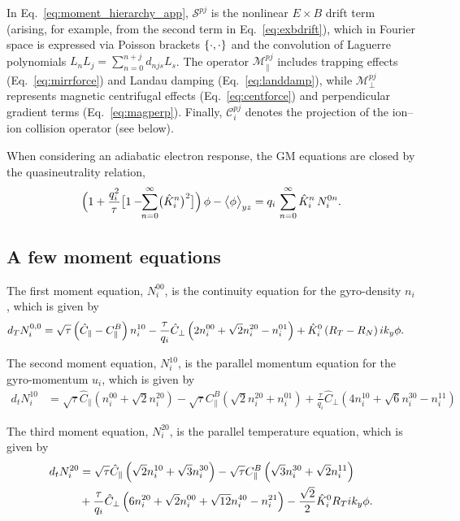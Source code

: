 \documentclass{article}
\begin{document}
In Eq.~\ref{eq:moment_hierarchy_app}, $\mathcal S^{pj}$ is the nonlinear  $E\times B$
drift term (arising, for example, from the second term in Eq.~\ref{eq:exbdrift}),
which in Fourier space is expressed via Poisson brackets $\left\{\cdot,\cdot\right\}$ 
and the convolution of Laguerre polynomials $L_nL_j=\sum_{n=0}^{n+j}d_{njs}L_s$. 
The operator $\mathcal M_{\parallel}^{pj}$ includes trapping effects 
(Eq.~\ref{eq:mirrforce}) and Landau damping (Eq.~\ref{eq:landdamp}), 
while $\mathcal M_{\perp}^{pj}$ represents magnetic centrifugal effects (Eq.~\ref{eq:centforce}) 
and perpendicular gradient terms (Eq.~\ref{eq:magperp}). 
Finally, $\mathcal C_i^{pj}$ denotes the projection of the ion--ion collision operator (see below).  
\par
When considering an adiabatic electron response, the GM equations are closed by the quasineutrality relation,
\begin{equation}
     \Bigl(1 + \frac{q_i^2}{\tau}\bigl[1-\!\!\sum_{n=0}^{\infty}\bigl(\hat K_{i}^n\bigr)^2\bigr]\Bigr)\,\phi  - \bigl\langle \phi \bigr\rangle_{y z} 
      =  q_i\,\sum_{n=0}^{\infty}\hat K_{i}^n\, N_i^{0n}.
    \label{ch5_eq:poisson_moments_adiabe}
\end{equation}

\subsection{A few moment equations}
The first moment equation, $N_i^{00}$, is the continuity equation for the gyro-density $n_i$, which is given by
\begin{align}
\label{eq:moment_0}
d_T N_i^{0,0}  &= \sqrt{\tau} \left( \hat{C}_{\parallel} - C^B_{\parallel} \right) n_i^{10}
- \frac{\tau}{q_i} \hat{C}_{\perp} \left(2 n_i^{00} + \sqrt{2} n_i^{20} - n_i^{01} \right)
+  \hat K_i^0 \left(  R_T - R_N \right) i k_y  \phi.
\end{align}

The second moment equation, $N_i^{10}$, is the parallel momentum equation for the gyro-momentum $u_i$, which is given by
\begin{align}
\label{eq:moment_1}
d_t N_i^{10} &= \sqrt{\tau} \hat{C}_{\parallel} \left( n_i^{00} + \sqrt{2} n_i^{20} \right) 
    - \sqrt{\tau} C^B_{\parallel} \left( \sqrt{2} n_i^{20} + n_i^{01} \right)
    + \frac{\tau}{q_i} \hat{C}_{\perp} \left( 4 n_i^{10} + \sqrt{6} n_i^{30} - n_i^{11} \right)
\end{align}

The third moment equation, $N_i^{20}$, is the parallel temperature equation, which is given by
\begin{align}
\label{eq:moment_2}
d_t N_i^{20} &= \sqrt{\tau} \hat{C}_{\parallel} \left( \sqrt{2}n_i^{10} + \sqrt{3} n_i^{30} \right) 
    - \sqrt{\tau} C^B_{\parallel} \left( \sqrt{3}n_i^{30} + \sqrt{2} n_i^{11} \right) \nonumber\\
    &+ \frac{\tau}{q_i} \hat{C}_{\perp} \left( 6 n_i^{20} + \sqrt{2} n_i^{00} + \sqrt{12} n_i^{40} - n_i^{21} \right) 
    - \frac{\sqrt{2}}{2} \hat K_i^0  R_T  i k_y \phi.
\end{align}
\end{document}
